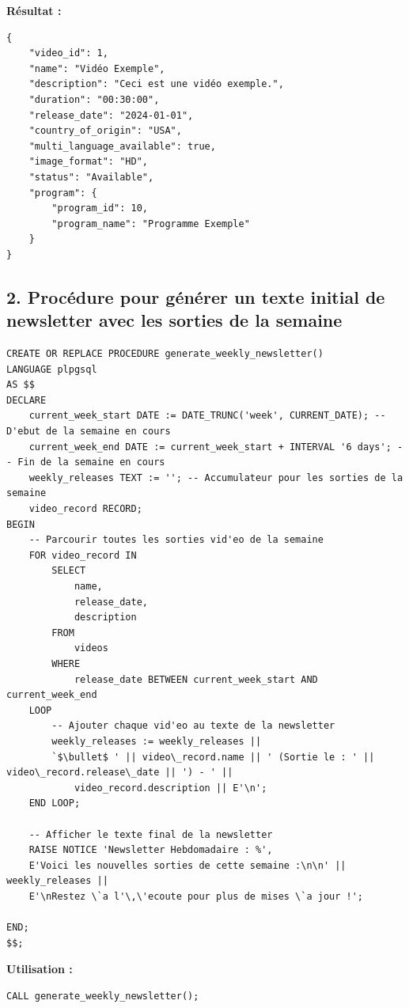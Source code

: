\documentclass[a4paper, 12pt]{article}
\begin{document}
\textbf{Résultat :}

\begin{verbatim}
{
    "video_id": 1,
    "name": "Vidéo Exemple",
    "description": "Ceci est une vidéo exemple.",
    "duration": "00:30:00",
    "release_date": "2024-01-01",
    "country_of_origin": "USA",
    "multi_language_available": true,
    "image_format": "HD",
    "status": "Available",
    "program": {
        "program_id": 10,
        "program_name": "Programme Exemple"
    }
}
\end{verbatim}

\subsection*{2. Procédure pour générer un texte initial de newsletter avec les sorties de la semaine}

\begin{lstlisting}
CREATE OR REPLACE PROCEDURE generate_weekly_newsletter()
LANGUAGE plpgsql
AS $$
DECLARE
    current_week_start DATE := DATE_TRUNC('week', CURRENT_DATE); -- D'ebut de la semaine en cours
    current_week_end DATE := current_week_start + INTERVAL '6 days'; -- Fin de la semaine en cours
    weekly_releases TEXT := ''; -- Accumulateur pour les sorties de la semaine
    video_record RECORD;
BEGIN
    -- Parcourir toutes les sorties vid'eo de la semaine
    FOR video_record IN 
        SELECT 
            name, 
            release_date, 
            description 
        FROM 
            videos 
        WHERE 
            release_date BETWEEN current_week_start AND current_week_end
    LOOP
        -- Ajouter chaque vid'eo au texte de la newsletter
        weekly_releases := weekly_releases || 
        `$\bullet$ ' || video\_record.name || ' (Sortie le : ' || video\_record.release\_date || ') - ' ||
            video_record.description || E'\n';
    END LOOP;

    -- Afficher le texte final de la newsletter
    RAISE NOTICE 'Newsletter Hebdomadaire : %', 
    E'Voici les nouvelles sorties de cette semaine :\n\n' || weekly_releases || 
    E'\nRestez \`a l'\,\'ecoute pour plus de mises \`a jour !';

END;
$$;
\end{lstlisting}

\textbf{Utilisation :}

\begin{lstlisting}
CALL generate_weekly_newsletter();
\end{lstlisting}
\end{document}
